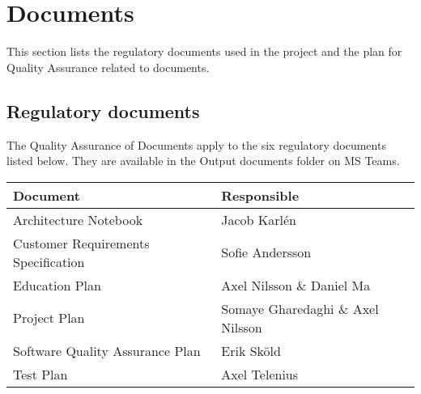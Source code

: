 \section{Documents}
This section lists the regulatory documents used in the project and the plan for Quality Assurance related to documents.

\subsection{Regulatory documents}
The Quality Assurance of Documents apply to the six regulatory documents listed below. They are available in the Output documents folder on MS Teams.

\begin{table}[!ht]
\centering
\begin{tabular}{ | l | l |}
    \hline
Document & Responsible\\
\hline
Architecture Notebook & Jacob Karlén\\
Customer Requirements Specification & Sofie Andersson\\
Education Plan & Axel Nilsson \& Daniel Ma\\
Project Plan & Somaye Gharedaghi \& Axel Nilsson\\
Software Quality Assurance Plan & Erik Sköld\\
Test Plan & Axel Telenius\\
\hline
\end{tabular}
\end{table}


